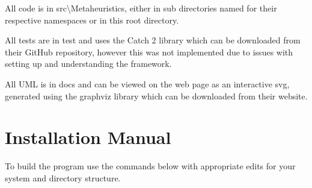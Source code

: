 \documentclass[]{final_report}
\begin{document}
All code is in src\textbackslash Metaheuristics,
either in sub directories named for their respective namespaces or in this root directory.

All tests are in test and uses the Catch 2 library which can be downloaded from their GitHub repository,
however this was not implemented due to issues with setting up and understanding the framework.

All UML is in docs and can be viewed on the web page as an interactive svg,
generated using the graphviz library which can be downloaded from their website.

\newpage
\section*{Installation Manual}

To build the program use the commands below with appropriate edits for your system and directory structure.
\end{document}
